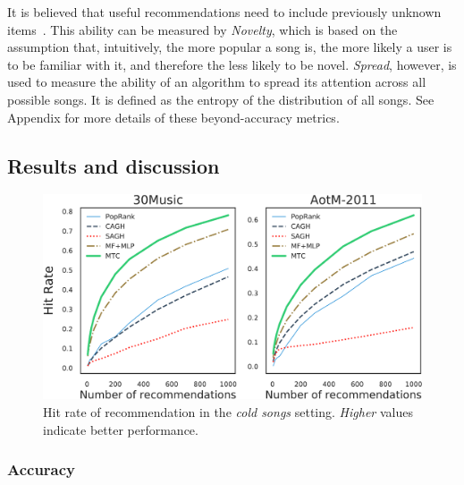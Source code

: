 It is believed that
useful recommendations need to include previously unknown items~\cite{herlocker2004evaluating,zhang2012auralist}.
This ability can be measured by \emph{Novelty},
which is based on the assumption that, intuitively, the more popular a song is, 
the more likely a user is to be familiar with it, and therefore the less likely to be novel.
%
\emph{Spread}, however, is used to measure the ability of an algorithm to spread its attention across all possible songs.
It is defined as the entropy of the distribution of all songs.
See Appendix for more details of these beyond-accuracy metrics.


\subsection{Results and discussion}

\begin{figure}[!t]
    \centering
    \includegraphics[width=\columnwidth]{fig/hr1.pdf}
    \caption{Hit rate of recommendation in the \emph{cold songs} setting.
\emph{Higher} values indicate better performance.}
    \label{fig:hr1}
\end{figure}



\subsubsection{Accuracy}

